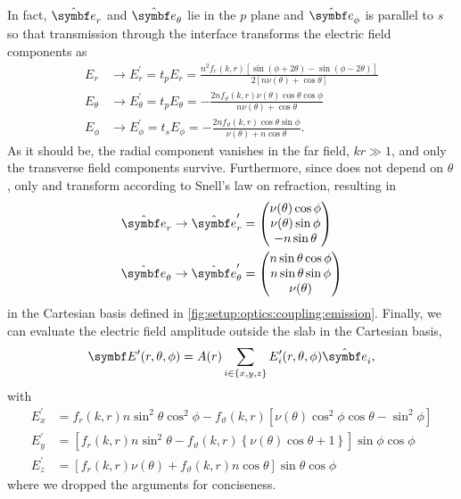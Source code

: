 In fact, $\ubvec{r}$ and $\ubvec{\theta}$ lie in the $p$ plane and $\ubvec{\phi}$ is parallel to $s$ so that transmission through the interface transforms the electric field components as
\begin{align}
    E_r &\to E_r^\prime = t_p E_r = \frac{n^2 f_r(k, r) \left[\sin(\phi + 2\theta) - \sin(\phi - 2\theta)\right]}{2\left[n\nu(\theta) + \cos\theta\right]} \\
    E_\theta &\to E_\theta^\prime = t_p E_\theta = -\frac{2n f_{\vartheta}(k, r)\nu(\theta)\cos\theta\cos\phi}{n\nu(\theta) + \cos\theta} \\
    E_\phi &\to E_\phi^\prime = t_s E_\phi = -\frac{2n f_{\vartheta}(k, r)\cos\theta\sin\phi}{\nu(\theta) + n\cos\theta}.
\end{align}
As it should be, the radial component vanishes in the far field, $kr\gg 1$, and only the transverse field components survive.
Furthermore, since \ubvec{\phi} does not depend on $\theta$, only  and \ubvec{\theta} transform according to Snell's law on refraction, resulting in
\begin{align}
    \ubvec{r} \to \ubvec{r}^\prime &= \begin{pmatrix}
        \nu(\theta) \cos\phi \\
        \nu(\theta) \sin\phi \\
        - n\sin\theta
    \end{pmatrix} \\
    \ubvec{\theta} \to \ubvec{\theta}^{\prime} &= \begin{pmatrix}
        n \sin\theta\cos\phi \\
        n \sin\theta\sin\phi \\
        \nu(\theta)
    \end{pmatrix}
\end{align}
in the Cartesian basis defined in \cref{fig:setup:optics:coupling:emission}.
Finally, we can evaluate the electric field amplitude outside the slab in the Cartesian basis,
\begin{equation}
    \bvec{E}^\prime(r, \theta, \phi) = A(r) \sum_{i\in\{x, y, z\}} E_i^\prime(r, \theta, \phi)\ubvec{i},
\end{equation}
with
\begin{align}
    E_x^{\prime} &= f_{r}{\left(k,r \right)} n \sin^{2}{\theta} \cos^{2}{\phi} - f_{\vartheta}{\left(k,r \right)} \left[\nu{\left(\theta \right)} \cos^{2}{\phi} \cos{\theta} - \sin^{2}{\phi}\right] \\
    E_y^{\prime} &= \left[f_{r}{\left(k,r \right)} n \sin^{2}{\theta} - f_{\vartheta}{\left(k,r \right)} \left\lbrace\nu{\left(\theta \right)} \cos{\theta} + 1\right\rbrace\right] \sin{\phi} \cos{\phi} \\
    E_z^{\prime} &= \left[f_{r}{\left(k,r \right)} \nu{\left(\theta \right)} + f_{\vartheta}{\left(k,r \right)} n \cos{\theta}\right] \sin{\theta} \cos{\phi}
\end{align}
where we dropped the arguments for conciseness.

